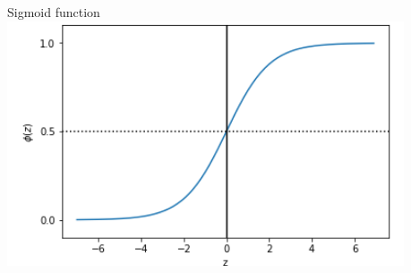 \documentclass{beamer}
\begin{document}
\begin{frame}
	 \begin{block}{Sigmoid function}
		 \includegraphics[width=\textwidth]{Sigmoid.png}
	\end{block}
\end{frame}
\end{document}
